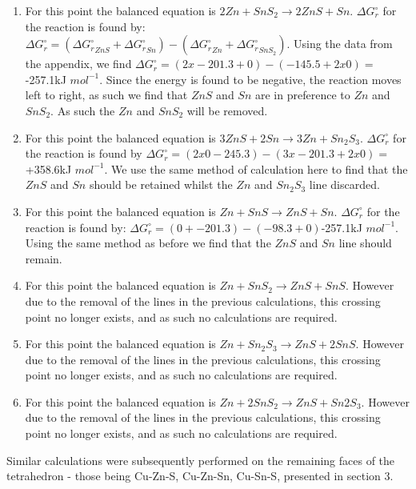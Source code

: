 \begin{enumerate}
\item For this point the balanced equation is $2 Zn + SnS_2 \rightarrow 2 ZnS + Sn$. $\Delta G_{r}^{\circ}$ for the reaction is found by: $\Delta G_{r}^{\circ} = (\Delta {G_{r}^{\circ}}_{ZnS} + \Delta {G_{r}^{\circ}}_{Sn}) - (\Delta {G_{r}^{\circ}}_{Zn} + \Delta {G_{r}^{\circ}}_{SnS_2})$. Using the data from the appendix, we find $\Delta G_{r}^{\circ}=(2x-201.3 + 0)-(-145.5+2x0)=$-257.1kJ $mol^{-1}$. Since the energy is found to be negative, the reaction moves left to right, as such we find that $ZnS$ and $Sn$ are in preference to $Zn$ and $SnS_2$. As such the $Zn$ and $SnS_2$ will be removed.


\item For this point the balanced equation is $ 3 ZnS + 2 Sn \rightarrow 3 Zn + Sn_2S_3$. $\Delta G_{r}^{\circ}$ for the reaction is found by $\Delta G_{r}^{\circ}=(2x0 -245.3)-(3x-201.3+2x0)=$+358.6kJ $mol^{-1}$. We use the same method of calculation here to find that the $ZnS$ and $Sn$ should be retained whilst the $Zn$ and $Sn_2S_3$ line discarded. 


\item For this point the balanced equation is $Zn + SnS \rightarrow ZnS + Sn$. $\Delta G_{r}^{\circ}$ for the reaction is found by: $\Delta G_{r}^{\circ}=(0+ -201.3)-(-98.3+0)$-257.1kJ $mol^{-1}$. Using the same method as before we find that the $ZnS$ and $Sn$ line should remain.
\item For this point the balanced equation is $Zn + SnS_2 \rightarrow ZnS + SnS$. However due to the removal of the lines in the previous calculations, this crossing point no longer exists, and as such no calculations are required.
\item For this point the balanced equation is $Zn + Sn_2S_3 \rightarrow ZnS + 2 SnS$. However due to the removal of the lines in the previous calculations, this crossing point no longer exists, and as such no calculations are required.
\item For this point the balanced equation is $Zn + 2 SnS_2 \rightarrow ZnS + Sn2S_3$. However due to the removal of the lines in the previous calculations, this crossing point no longer exists, and as such no calculations are required.
\end{enumerate}

Similar calculations were subsequently performed on the remaining faces of the tetrahedron - those being Cu-Zn-S, Cu-Zn-Sn, Cu-Sn-S, presented in section 3.
